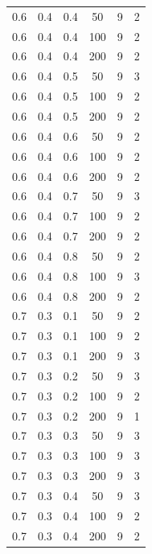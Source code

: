 \documentclass[a4paper,14pt, unknownkeysallowed]{extreport}
\begin{document}
\begin{center}
\begin{longtable}[c]{|c|c|c|c|c|c|}
        \hline
         0.6 &  0.4 &  0.4 &   50 &     9 &     2 \\
         0.6 &  0.4 &  0.4 &  100 &     9 &     2 \\
         0.6 &  0.4 &  0.4 &  200 &     9 &     2 \\
        \hline
         0.6 &  0.4 &  0.5 &   50 &     9 &     3 \\
         0.6 &  0.4 &  0.5 &  100 &     9 &     2 \\
         0.6 &  0.4 &  0.5 &  200 &     9 &     2 \\
        \hline
         0.6 &  0.4 &  0.6 &   50 &     9 &     2 \\
         0.6 &  0.4 &  0.6 &  100 &     9 &     2 \\
         0.6 &  0.4 &  0.6 &  200 &     9 &     2 \\
        \hline
         0.6 &  0.4 &  0.7 &   50 &     9 &     3 \\
         0.6 &  0.4 &  0.7 &  100 &     9 &     2 \\
         0.6 &  0.4 &  0.7 &  200 &     9 &     2 \\
        \hline
         0.6 &  0.4 &  0.8 &   50 &     9 &     2 \\
         0.6 &  0.4 &  0.8 &  100 &     9 &     3 \\
         0.6 &  0.4 &  0.8 &  200 &     9 &     2 \\
        \hline
         0.7 &  0.3 &  0.1 &   50 &     9 &     2 \\
         0.7 &  0.3 &  0.1 &  100 &     9 &     2 \\
         0.7 &  0.3 &  0.1 &  200 &     9 &     3 \\
        \hline
         0.7 &  0.3 &  0.2 &   50 &     9 &     3 \\
         0.7 &  0.3 &  0.2 &  100 &     9 &     2 \\
         0.7 &  0.3 &  0.2 &  200 &     9 &     1 \\
        \hline
         0.7 &  0.3 &  0.3 &   50 &     9 &     3 \\
         0.7 &  0.3 &  0.3 &  100 &     9 &     3 \\
         0.7 &  0.3 &  0.3 &  200 &     9 &     3 \\
        \hline
         0.7 &  0.3 &  0.4 &   50 &     9 &     3 \\
         0.7 &  0.3 &  0.4 &  100 &     9 &     2 \\
         0.7 &  0.3 &  0.4 &  200 &     9 &     2 \\

\end{longtable}
\end{center}
\end{document}
